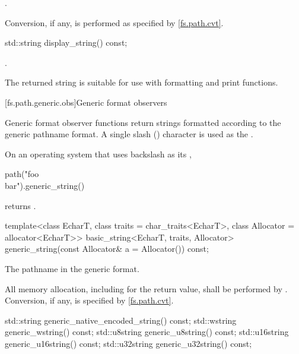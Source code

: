 \begin{itemdescr}
\pnum
\returns
{}.

\pnum
\remarks
Conversion, if any, is performed as specified
by \ref{fs.path.cvt}.
\end{itemdescr}

%
\begin{itemdecl}
std::string display_string() const;
\end{itemdecl}

\begin{itemdescr}
\pnum
\returns
{}.
\begin{note}
The returned string is suitable for use with formatting
and print functions.
\end{note}
\end{itemdescr}

[fs.path.generic.obs]{Generic format observers}

\pnum
Generic format observer functions return strings formatted according to the
generic pathname format.
A single slash () character is used as
the .

\pnum
\begin{example}
On an operating system that uses backslash as
its ,
\begin{codeblock}
path("foo\\bar").generic_string()
\end{codeblock}
returns .
\end{example}

%
\begin{itemdecl}
template<class EcharT, class traits = char_traits<EcharT>, class Allocator = allocator<EcharT>>
  basic_string<EcharT, traits, Allocator> generic_string(const Allocator& a = Allocator()) const;
\end{itemdecl}

\begin{itemdescr}
\pnum
\returns
The pathname in the generic format.

\pnum
\remarks
All memory allocation, including for the return value, shall
be performed by . Conversion, if any, is specified by
\ref{fs.path.cvt}.
\end{itemdescr}

%
%
%
%
%
\begin{itemdecl}
std::string generic_native_encoded_string() const;
std::wstring generic_wstring() const;
std::u8string generic_u8string() const;
std::u16string generic_u16string() const;
std::u32string generic_u32string() const;
\end{itemdecl}

